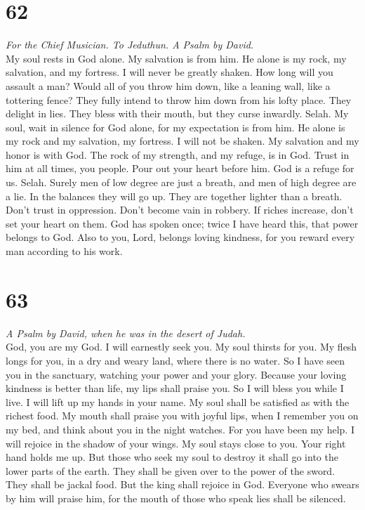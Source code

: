 \hypertarget{section-61}{%
\section{62}\label{section-61}}

\emph{For the Chief Musician. To Jeduthun. A Psalm by David.}\\
 My soul rests in God alone. My salvation is from him.
 He alone is my rock, my salvation, and my fortress. I
will never be greatly shaken.  How long will you assault a
man? Would all of you throw him down, like a leaning wall, like a
tottering fence?  They fully intend to throw him down from
his lofty place. They delight in lies. They bless with their mouth, but
they curse inwardly. Selah.  My soul, wait in silence for
God alone, for my expectation is from him.  He alone is my
rock and my salvation, my fortress. I will not be shaken. 
My salvation and my honor is with God. The rock of my strength, and my
refuge, is in God.  Trust in him at all times, you people.
Pour out your heart before him. God is a refuge for us. Selah.
 Surely men of low degree are just a breath, and men of
high degree are a lie. In the balances they will go up. They are
together lighter than a breath.  Don't trust in
oppression. Don't become vain in robbery. If riches increase, don't set
your heart on them.  God has spoken once; twice I have
heard this, that power belongs to God.  Also to you,
Lord, belongs loving kindness, for you reward every man according to his
work.

\hypertarget{section-62}{%
\section{63}\label{section-62}}

\emph{A Psalm by David, when he was in the desert of Judah.}\\
 God, you are my God. I will earnestly seek you. My soul
thirsts for you. My flesh longs for you, in a dry and weary land, where
there is no water.  So I have seen you in the sanctuary,
watching your power and your glory.  Because your loving
kindness is better than life, my lips shall praise you. 
So I will bless you while I live. I will lift up my hands in your name.
 My soul shall be satisfied as with the richest food. My
mouth shall praise you with joyful lips,  when I remember
you on my bed, and think about you in the night watches. 
For you have been my help. I will rejoice in the shadow of your wings.
 My soul stays close to you. Your right hand holds me up.
 But those who seek my soul to destroy it shall go into
the lower parts of the earth.  They shall be given over
to the power of the sword. They shall be jackal food. 
But the king shall rejoice in God. Everyone who swears by him will
praise him, for the mouth of those who speak lies shall be silenced.

